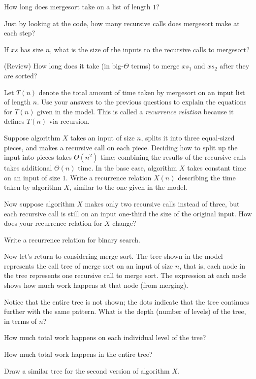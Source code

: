 \documentclass{tufte-handout}
\begin{document}
\begin{questions}
  \item How long does \textsf{mergesort} take on a list of length $1$?
  \item Just by looking at the code, how many recursive calls does
  \textsf{mergesort} make at each step?
  \item If $xs$ has size $n$, what is the size of the inputs to the
    recursive calls to \textsf{mergesort}?
  \item (Review) How long does it take (in big-$\Theta$ terms) to
    merge $xs_1$ and $xs_2$ after they are sorted?
  \item Let $T(n)$ denote the total amount of time taken by
    \textsf{mergesort} on an input list of length $n$.  Use your
    answers to the previous questions to explain the equations for
    $T(n)$ given in the model.  This is called a \emph{recurrence
      relation} because it defines $T(n)$ via recursion.
  \item Suppose algorithm $X$ takes an input of size $n$, splits it
    into three equal-sized pieces, and makes a recursive call on each
    piece.  Deciding how to split up the input into pieces takes
    $\Theta(n^2)$ time; combining the results of the recursive calls
    takes additional $\Theta(n)$ time.  In the base case, algorithm
    $X$ takes constant time on an input of size $1$. Write a
    recurrence relation $X(n)$ describing the time taken by algorithm
    $X$, similar to the one given in the model.
  \item Now suppose algorithm $X$ makes only two recursive calls instead
    of three, but each recursive call is still on an input one-third
    the size of the original input.  How does your recurrence relation
    for $X$ change?
  \item Write a recurrence relation for binary search.
\end{questions}

Now let's return to considering merge sort.  The tree shown in
the model represents the call tree of merge sort on an input of
size $n$, that is, each node in the tree represents one recursive call
to merge sort.  The expression at each node shows how much work
happens at that node (from merging).

\begin{questions}
  \item Notice that the entire tree is not shown; the dots indicate
    that the tree continues further with the same pattern.  What is
    the depth (number of levels) of the tree, in terms of $n$?
  \item How much total work happens on each individual level of the tree?
  \item How much total work happens in the entire tree?
  \item Draw a similar tree for the second version of algorithm $X$.
\end{questions}
\end{document}

